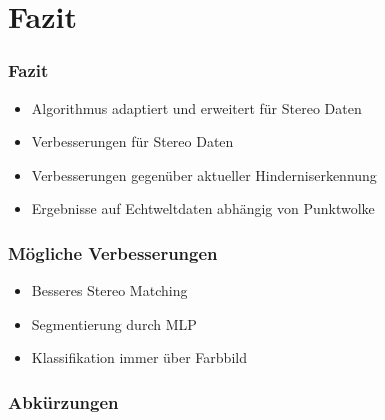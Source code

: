 \section{Fazit}
\begin{frame}
    \frametitle{Fazit}
    \begin{itemize}
        \item Algorithmus adaptiert und erweitert für Stereo Daten
            \pause
        \item Verbesserungen für Stereo Daten
            \pause
        \item Verbesserungen gegenüber aktueller Hinderniserkennung
            \pause
        \item Ergebnisse auf Echtweltdaten abhängig von Punktwolke
    \end{itemize}
\end{frame}

\begin{frame}
    \frametitle{Mögliche Verbesserungen}
    \begin{itemize}
        \item Besseres Stereo Matching
            \pause
        \item Segmentierung durch MLP
            \pause
        \item Klassifikation immer über Farbbild
    \end{itemize}
\end{frame}

\begin{frame}
    \frametitle{Abkürzungen}
    
\end{frame}
